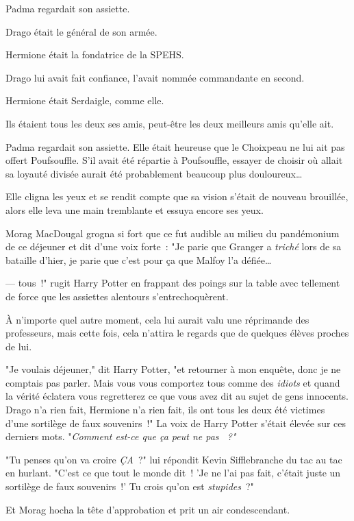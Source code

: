 \later

Padma regardait son assiette.

Drago était le général de son armée.

Hermione était la fondatrice de la SPEHS.

Drago lui avait fait confiance, l'avait nommée commandante en second.

Hermione était Serdaigle, comme elle.

Ils étaient tous les deux ses amis, peut-être les deux meilleurs amis qu'elle ait.

Padma regardait son assiette. Elle était heureuse que le Choixpeau ne lui ait pas offert Poufsouffle. S'il avait été répartie à Poufsouffle, essayer de choisir où allait sa loyauté divisée aurait été probablement beaucoup plus douloureux…

Elle cligna les yeux et se rendit compte que sa vision s'était de nouveau brouillée, alors elle leva une main tremblante et essuya encore ses yeux.

Morag MacDougal grogna si fort que ce fut audible au milieu du pandémonium de ce déjeuner et dit d'une voix forte~: "Je parie que Granger a \emph{triché} lors de sa bataille d'hier, je parie que c'est pour ça que Malfoy l'a défiée…

---  tous~!" rugit Harry Potter en frappant des poings sur la table avec tellement de force que les assiettes alentours s'entrechoquèrent.

À n'importe quel autre moment, cela lui aurait valu une réprimande des professeurs, mais cette fois, cela n'attira le regards que de quelques élèves proches de lui.

"Je voulais déjeuner," dit Harry Potter, "et retourner à mon enquête, donc je ne comptais pas parler. Mais vous vous comportez tous comme des \emph{idiots} et quand la vérité éclatera vous regretterez ce que vous avez dit au sujet de gens innocents. Drago n'a rien fait, Hermione n'a rien fait, ils ont tous les deux été victimes d'une sortilège de faux souvenirs~!" La voix de Harry Potter s'était élevée sur ces derniers mots. "\emph{Comment est-ce que ça peut ne pas ~?"}

"Tu penses qu'on va croire \emph{ÇA}~?" lui répondit Kevin Sifflebranche du tac au tac en hurlant. "C'est ce que tout le monde dit~! 'Je ne l'ai pas fait, c'était juste un sortilège de faux souvenirs~!' Tu crois qu'on est \emph{stupides}~?"

Et Morag hocha la tête d'approbation et prit un air condescendant.

